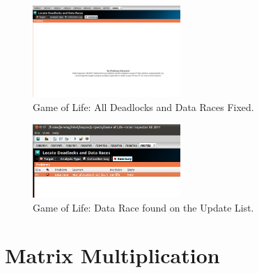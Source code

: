 \documentclass[journal,10pt,onecolumn]{IEEEtran}
\begin{document}
\begin{figure}[!t]
\begin{center}
\includegraphics[width=0.5\textwidth]{figures/ChangeSet14.png}
\caption{Game of Life: All Deadlocks and Data Races Fixed.}
\label{fig:inspector_clean_deadlocks}
\end{center}
\end{figure}

\begin{figure}[!t]
\begin{center}
\includegraphics[width=0.5\textwidth]{figures/Data_Race_Anaylsis.png}
\caption{Game of Life: Data Race found on the Update List.}
\label{fig:inspector_data_race_allocator}
\end{center}
\end{figure}

\section{Matrix Multiplication}




\end{document}
